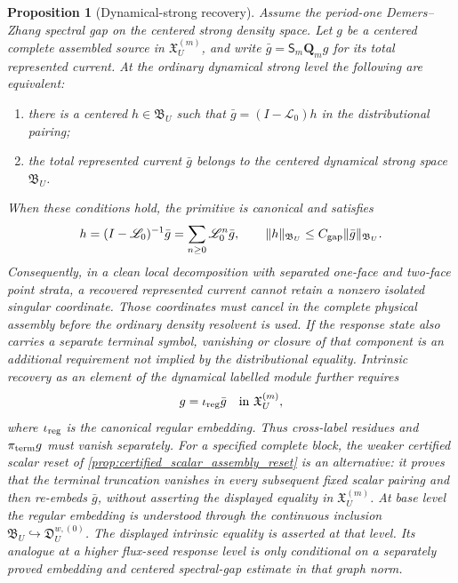 \documentclass[11pt]{amsart}
\theoremstyle{compactplain}
\newtheorem{proposition}[theorem]{Proposition}
\theoremstyle{compactdefinition}
\theoremstyle{compactremark}
\newcommand{\Ltransfer}{\mathscr L}
\begin{document}
\begin{proposition}[Dynamical-strong recovery]
\label{prop:strong_recovery_equivalence}
Assume the period-one Demers--Zhang spectral gap on the centered strong
density space.  Let \(g\) be a centered complete assembled source in
\(\mathfrak X_U^{(m)}\), and write
\(\bar g=\mathsf S_m\mathbf Q_m g\) for its total represented current.  At the
ordinary dynamical strong level the following are equivalent:
\begin{enumerate}[label=\textup{(\roman*)},wide,labelindent=0pt]
  \item there is a centered \(h\in\mathfrak B_U\) such that
  \(\bar g=(I-\Ltransfer_0)h\) in the distributional pairing;
  \item the total represented current \(\bar g\) belongs
  to the centered dynamical strong space \(\mathfrak B_U\).
\end{enumerate}
When these conditions hold, the primitive is canonical and satisfies
\begin{equation}
\label{eq:canonical_strong_recovery}
 h=(I-\Ltransfer_0)^{-1}\bar g
   =\sum_{n\ge0}\Ltransfer_0^n \bar g,
 \qquad
 \|h\|_{\mathfrak B_U}\le C_{\rm gap}\|\bar g\|_{\mathfrak B_U}.
\end{equation}
Consequently, in a clean local decomposition with separated one-face and
two-face point strata, a recovered represented current cannot retain a
nonzero isolated singular coordinate.  Those coordinates must cancel in the
complete physical assembly before the ordinary density resolvent is used.  If
the response state also carries a separate terminal symbol, vanishing or
closure of that component is an additional requirement not implied by the
distributional equality.
Intrinsic recovery as an element of the \emph{dynamical} labelled module
further requires
\[
 g=\iota_{\rm reg}\bar g\quad\hbox{in }\mathfrak X_U^{(m)},
\]
where \(\iota_{\rm reg}\) is the canonical regular embedding.  Thus
cross-label residues and \(\pi_{\rm term}g\) must vanish separately.
For a specified complete block, the weaker certified scalar reset of
\cref{prop:certified_scalar_assembly_reset} is an alternative: it proves that
the terminal truncation vanishes in every subsequent fixed scalar pairing and
then re-embeds \(\bar g\), without asserting the displayed equality in
\(\mathfrak X_U^{(m)}\).
At base level the regular embedding is understood through the continuous
inclusion
\(\mathfrak B_U\hookrightarrow\mathfrak D_U^{w,(0)}\).  The displayed
intrinsic equality is asserted at that level.  Its analogue at a higher
flux-seed response level is only conditional on a separately proved embedding
and centered spectral-gap estimate in that graph norm.
\end{proposition}
\end{document}
